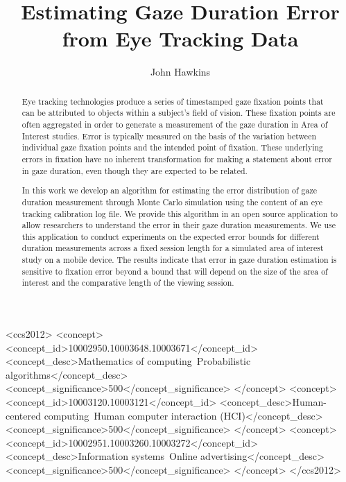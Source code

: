 \documentclass[sigconf]{acmart}
\numberwithin{equation}{section}
\begin{document}
 
\title{Estimating Gaze Duration Error from Eye Tracking Data}

\author{John Hawkins}
\renewcommand{\shortauthors}{Hawkins}

\begin{abstract}
Eye tracking technologies produce a series of timestamped gaze fixation points 
that can be attributed to objects within a subject's field of vision. 
These fixation points are often aggregated in order to generate a measurement
of the gaze duration in Area of Interest studies.
Error is typically measured on the basis of the variation between individual 
gaze fixation points and the intended point of fixation.
These underlying errors in fixation have no inherent transformation for making
a statement about error in gaze duration, even though they are expected to be
related.

In this work we develop an algorithm for estimating the error distribution of 
gaze duration measurement through Monte Carlo simulation using the content 
of an eye tracking calibration log file. 
We provide this algorithm in an open source application
to allow researchers to understand the error in their gaze duration measurements. 
We use this application to conduct experiments on the expected error bounds for 
different duration measurements across a fixed session length for a simulated 
area of interest study on a mobile device. 
The results indicate that error in gaze duration estimation is sensitive to
fixation error beyond a bound that will depend on the size of the area of interest 
and the comparative length of the viewing session.
\end{abstract}


\begin{CCSXML}
<ccs2012>
   <concept>
       <concept_id>10002950.10003648.10003671</concept_id>
       <concept_desc>Mathematics of computing~Probabilistic algorithms</concept_desc>
       <concept_significance>500</concept_significance>
       </concept>
   <concept>
       <concept_id>10003120.10003121</concept_id>
       <concept_desc>Human-centered computing~Human computer interaction (HCI)</concept_desc>
       <concept_significance>500</concept_significance>
       </concept>
   <concept>
       <concept_id>10002951.10003260.10003272</concept_id>
       <concept_desc>Information systems~Online advertising</concept_desc>
       <concept_significance>500</concept_significance>
       </concept>
 </ccs2012>
\end{CCSXML}
\end{document}
